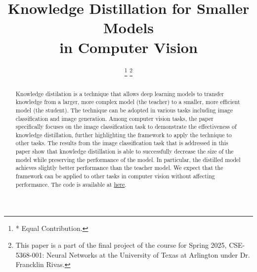 \documentclass[conference]{IEEEtran}
\begin{document}
\title{
    Knowledge Distillation for Smaller Models\\in Computer Vision
}

\author{
\thanks{* Equal Contribution.}
\thanks{This paper is a part of the final project of the course for Spring 2025, CSE-5368-001: Neural Networks at the University of Texas at Arlington under Dr. Francklin Rivas.}
}

\maketitle

\begin{abstract}
    Knowledge distilation is a technique that allows deep learning models to transfer knowledge from a larger, more complex model (the teacher)
    to a smaller, more efficient model (the student).
    The technique can be adopted in various tasks including image classification and image generation.
    Among computer vision tasks, the paper specifically focuses on the image classification task to demonstrate the effectiveness of knowledge distillation, further highlighting the framework to apply the technique to other tasks.
    The results from the image classification task that is addressed in this paper
    show that knowledge distillation is able to successfully decrease the size of the model while preserving the performance of the model.
    In particular, the distilled model achieves slightly better performance than the teacher model.
    We expect that the framework can be applied to other tasks in computer vision without affecting performance.
    The code is available at \href{https://github.com/Abhinaykotla/Knowledge_Distilation_for_Smaller_Models_in_CV_CSE5368}{here}.
\end{abstract}
\end{document}
